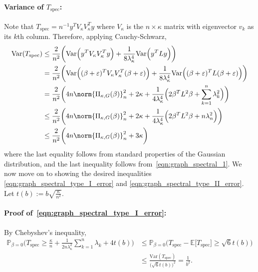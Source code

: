 \documentclass{article}
\newcommand{\Var}{\mathrm{Var}}
\newcommand{\1}{\mathbf{1}}
\newcommand{\Pbb}{\mathbb{P}}
\newcommand{\Ebb}{\mathbb{E}}
\newcommand{\spec}{\mathrm{spec}}
\theoremstyle{alden}
\theoremstyle{aldenthm}
\theoremstyle{definition}
\theoremstyle{remark}
\begin{document}
\paragraph{Variance of $T_{\mathrm{spec}}$:}
Note that $T_{\mathrm{spec}} = n^{-1} y^T V_{\kappa} V_{\kappa}^T y$ where $V_{\kappa}$ is the $n \times \kappa$ matrix with eigenvector $v_k$ as its $k$th column. Therefore, applying Cauchy-Schwarz,
\begin{align*}
\Var(T_{\spec}) & \leq \frac{2}{n^2} \biggl( \Var\Bigl(y^T V_{\kappa} V_{\kappa}^T y\Bigr) + \frac{1}{8 \lambda_{\kappa}^4}\Var\Bigl(y^T L y\Bigr) \biggr) \\
& = \frac{2}{n^2} \biggl( \Var\Bigl((\beta + \varepsilon)^T V_{\kappa} V_{\kappa}^T (\beta + \varepsilon)\Bigr) + \frac{1}{8 \lambda_{\kappa}^4}\Var\Bigl((\beta + \varepsilon)^T L (\beta + \varepsilon)\Bigr) \biggr) \\
& = \frac{2}{n^2}\biggl(4 n \norm{\Pi_{\kappa,G}(\beta)}_n^2 + 2 \kappa + \frac{1}{4\lambda_{\kappa}^4} \Bigl(2\beta^T L^2 \beta + \sum_{k = 1}^{n} \lambda_k^2 \Bigr)\biggr) \\
& \leq  \frac{2}{n^2}\biggl(4 n \norm{\Pi_{\kappa,G}(\beta)}_n^2 + 2 \kappa + \frac{1}{4\lambda_{\kappa}^4} \Bigl(2\beta^T L^2 \beta + n \lambda_n^2 \Bigr)\biggr) \\
& \leq \frac{2}{n^2}\biggl(4 n \norm{\Pi_{\kappa,G}(\beta)}_n^2 + 3 \kappa \biggr)
\end{align*}
where the last equality follows from standard properties of the Gaussian distribution, and the last inequality follows from~\eqref{eqn:graph_spectral_1}. We now move on to showing the desired inequalities \eqref{eqn:graph_spectral_type_I_error} and \eqref{eqn:graph_spectral_type_II_error}. Let $t(b) := b\sqrt{\frac{\kappa}{n^2}}$.

\paragraph{Proof of~\eqref{eqn:graph_spectral_type_I_error}:} By Chebyshev's inequality,
\begin{align*}
\Pbb_{\beta = 0}\biggl(T_{\spec} \geq \frac{\kappa}{n} + \frac{1}{2 n\lambda_{\kappa}^2}\sum_{k = 1}^{n} \lambda_k + 4t(b)\biggr)
& \leq \Pbb_{\beta = 0}\biggl(T_{\spec} - \Ebb\bigl[T_{\spec}\bigr] \geq \sqrt{6} t(b)\biggr) \\
& \leq \frac{\Var(T_{\spec})}{\bigl(\sqrt{6}t(b)\bigr)^2} = \frac{1}{b^2}.
\end{align*}
\end{document}
